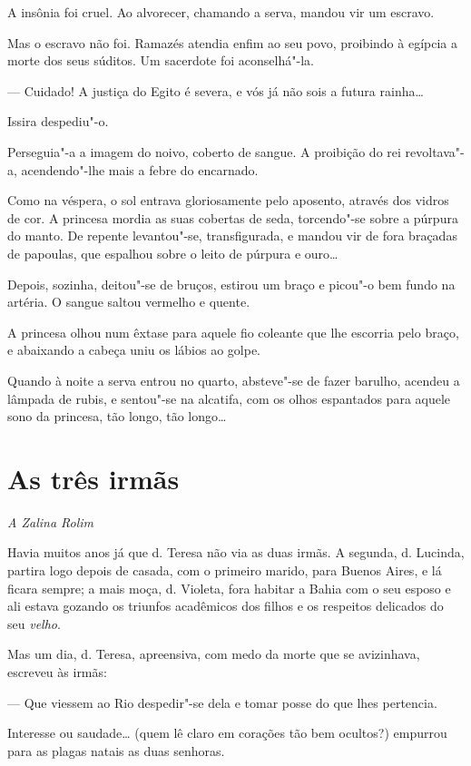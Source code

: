 A insônia foi cruel. Ao alvorecer, chamando a serva, mandou vir um
escravo.

Mas o escravo não foi. Ramazés atendia enfim ao seu povo, proibindo à
egípcia a morte dos seus súditos. Um sacerdote foi aconselhá"-la.

--- Cuidado! A justiça do Egito é severa, e vós já não sois a futura
rainha\ldots{}

Issira despediu"-o.

Perseguia"-a a imagem do noivo, coberto de sangue. A proibição do rei
revoltava"-a, acendendo"-lhe mais a febre do encarnado.

Como na véspera, o sol entrava gloriosamente pelo aposento, através dos
vidros de cor. A princesa mordia as suas cobertas de seda, torcendo"-se
sobre a púrpura do manto. De repente levantou"-se, transfigurada, e
mandou vir de fora braçadas de papoulas, que espalhou sobre o leito de
púrpura e ouro\ldots{}

Depois, sozinha, deitou"-se de bruços, estirou um braço e picou"-o bem
fundo na artéria. O sangue saltou vermelho e quente.

A princesa olhou num êxtase para aquele fio coleante que lhe escorria
pelo braço, e abaixando a cabeça uniu os lábios ao golpe.

Quando à noite a serva entrou no quarto, absteve"-se de fazer barulho,
acendeu a lâmpada de rubis, e sentou"-se na alcatifa, com os olhos
espantados para aquele sono da princesa, tão longo, tão longo\ldots{}

\chapter{As três irmãs}

\hfill{}\emph{A Zalina Rolim}

\bigskip

\noindent{}Havia muitos anos já que d. Teresa não via as duas irmãs. A segunda, d.
Lucinda, partira logo depois de casada, com o primeiro marido, para
Buenos Aires, e lá ficara sempre; a mais moça, d. Violeta, fora habitar
a Bahia com o seu esposo e ali estava gozando os triunfos acadêmicos dos
filhos e os respeitos delicados do seu \emph{velho}.

Mas um dia, d. Teresa, apreensiva, com medo da morte que se avizinhava,
escreveu às irmãs:

--- Que viessem ao Rio despedir"-se dela e tomar posse do que lhes
pertencia.

Interesse ou saudade\ldots{} (quem lê claro em corações tão bem ocultos?)
empurrou para as plagas natais as duas senhoras.

